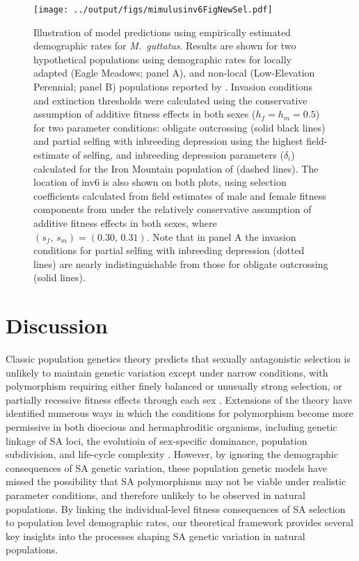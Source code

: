 \documentclass[11pt]{article}
\begin{document}
\begin{figure}[htbp]
 \centering
 \texttt{[image: ../output/figs/mimulusinv6FigNewSel.pdf]}
 \caption{\footnotesize{Illustration of model predictions using empirically estimated demographic rates for {\itshape M.~guttatus}. Results are shown for two hypothetical populations using demographic rates for locally adapted (Eagle Meadows; panel A), and non-local (Low-Elevation Perennial; panel B) populations reported by \citet{PetersonEtAl2016}. Invasion conditions and extinction thresholds were calculated using the conservative assumption of additive fitness effects in both sexes ($h_f = h_m = 0.5$) for two parameter conditions: obligate outcrossing (solid black lines)  and partial selfing with inbreeding depression using the highest field-estimate of selfing, and inbreeding depression parameters ($\delta_i$) calculated for the Iron Mountain population of \citet{Willis1993} (dashed lines). The location of inv6 is also shown on both plots, using selection coefficients calculated from field estimates of male and female fitness components from \citet{LeeKelly2015} under the relatively conservative assumption of additive fitness effects in both sexes, where $(s_f,\,s_m) = (0.30,\, 0.31)$. Note that in panel A the invasion conditions for partial selfing with inbreeding depression (dotted lines) are nearly indistinguishable from those for obligate outcrossing (solid lines).}} 
 \label{fig:mimulusFig}
 \end{figure}





\section*{Discussion}

Classic population genetics theory predicts that sexually antagonistic selection is unlikely to maintain genetic variation except under narrow conditions, with polymorphism requiring either finely balanced or unusually strong selection, or partially recessive fitness effects through each sex \citep{Kidwell1977,Pamilo1979,Prout2000, ConnallonClark2014}. Extensions of the theory have identified numerous ways in which the conditions for polymorphism become more permissive in both dioecious and hermaphroditic organisms, including genetic linkage of SA loci, the evolutioin of sex-specific dominance, population subdivision, and life-cycle complexity \citep[e.g.,][]{Patten2010,JordanConnallon2014,JordanCharlesworth2012,SpencerPriest2016, ConnallonSharmaOlito2019, Olito-etal-2018}. However, by ignoring the demographic consequences of SA genetic variation, these population genetic models have missed the possibility that SA polymorphisms may not be viable under realistic parameter conditions, and therefore unlikely to be observed in natural populations. By linking the individual-level fitness consequences of SA selection to population level demographic rates, our theoretical framework provides several key insights into the processes shaping SA genetic variation in natural populations.
\end{document}

